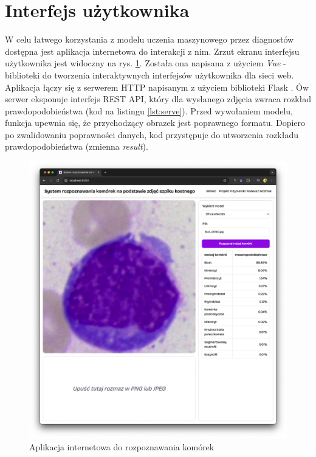 \section{Interfejs użytkownika}

W celu łatwego korzystania z modelu uczenia maszynowego przez diagnostów dostępna jest aplikacja internetowa do interakcji z nim.
Zrzut ekranu interfejsu użytkownika jest widoczny na rys. \ref{fig:ui}.
Została ona napisana z użyciem \textit{Vue} \cite{vue} - biblioteki do tworzenia interaktywnych interfejsów użytkownika dla sieci web.
Aplikacja łączy się z serwerem HTTP napisanym z użyciem biblioteki Flask \cite{flask}.
Ów serwer eksponuje interfejs REST API, który dla wysłanego zdjęcia zwraca rozkład prawdopodobieństwa (kod na listingu \ref{lst:serve}).
Przed wywołaniem modelu, funkcja upewnia się, że przychodzący obrazek jest poprawnego formatu.
Dopiero po zwalidowaniu poprawności danych, kod przystępuje do utworzenia rozkładu prawdopodobieństwa (zmienna \textit{result}).



\begin{figure}
    \centering
    \includegraphics[width=\textwidth]{app}
    \caption{Aplikacja internetowa do rozpoznawania komórek}
    \label{fig:ui}
\end{figure}


